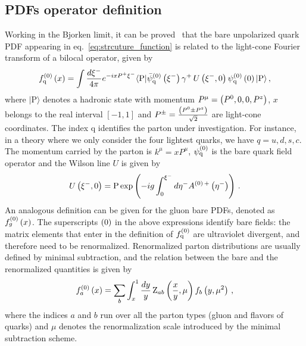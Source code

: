 \subsection{PDFs operator definition}
\label{sec:PDFsdef}
Working in the Bjorken limit, it can be proved~\cite{Collins:1980ui,Collins:1981uw} that the bare unpolarized 
quark PDF appearing in eq.~\eqref{eq:strcuture_function} is related to the light-cone Fourier transform 
of a bilocal operator, given by
\begin{align}
	\label{eq::barepdf}                                                  
	f_\mathrm{q}^{(0)}\left( x \right) = \int \frac{d\xi^-}{4\pi} e^{-ixP^+\xi^-} 
	\langle \text{P}|\bar{\psi}_\mathrm{q}^{(0)}\left(\xi^-\right)\gamma^+ \,   
	U\left(\xi^-,0\right) \psi_\mathrm{q}^{(0)}\left( 0\right)  |\text{P}\rangle\, ,   
\end{align}
where $|\text{P}\rangle$ denotes a hadronic state with momentum $P^\mu = \left(
P^0,0,0,P^z\right)$, $x$ belongs to the real interval $\left[-1,1\right]$ and $P^{\pm}=\frac {\left( P^0 \pm P^z \right)}{ \sqrt{2}}$ are
light-cone coordinates. 
The index $\mathrm{q}$ identifies the parton under
investigation. For instance, in a theory where we only consider the four
lightest quarks, we have $q=u,d,s,c$. The momentum carried by the parton is
$k^\mu = x P^\mu$, $\psi_\mathrm{q}^{(0)}$ is the bare quark field operator and the
Wilson line $U$ is given by 
\begin{align}
	\label{eq::wilsonline}                                                      
    U\left(\xi^-,0\right) = \text{P}\exp 
    \left( -ig\int_0^{\xi^-}d\eta^- A^{{(0)}\,+}\left( \eta^- \right) \right)\, .         
\end{align}
An analogous definition can be given for the gluon bare PDFs, denoted as
$f_g^{(0)}\left( x \right)$. The superscripts ${(0)}$ in the above expressions identify
bare fields: the matrix elements that enter in the definition of
$f_\mathrm{q}^{(0)}$ are ultraviolet divergent, and therefore need to be
renormalized.
Renormalized parton distributions are usually defined by minimal
subtraction, and the relation between the bare and the renormalized quantities
is given by
\begin{align}
	\label{eq:RenormPDF}                                   
	f_a^{(0)}\left( x \right) = \sum_{b}\int_x^1\frac{dy}{y}\,\text{Z}_{ab}\left(\frac{x}{y},\mu \right) f_b\left( y,\mu^2 \right)\, , 
\end{align}
where the indices $a$ and $b$ run over all the parton types (gluon and flavors
of quarks) and $\mu$ denotes the renormalization scale introduced by the minimal
subtraction scheme. 

